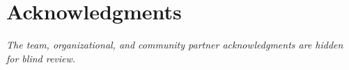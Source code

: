 \documentclass[a4paper]{article}
\begin{document}
\section{Acknowledgments}
\textit{The team, organizational, and community partner
  acknowledgments are hidden for blind review.}



\end{document}
